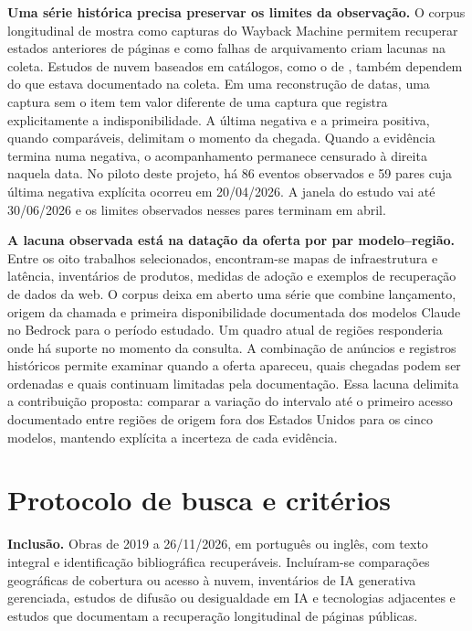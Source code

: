 \documentclass[12pt,a4paper]{article}
\begin{document}
\textbf{Uma série histórica precisa preservar os limites da observação.}
O corpus longitudinal de \citet[seções 4 e 5, tabela 1]{amos2021} mostra como capturas do Wayback Machine permitem recuperar estados anteriores de páginas e como falhas de arquivamento criam lacunas na coleta. Estudos de nuvem baseados em catálogos, como o de \citet[seções III e VI]{ekwe2024}, também dependem do que estava documentado na coleta. Em uma reconstrução de datas, uma captura sem o item tem valor diferente de uma captura que registra explicitamente a indisponibilidade. A última negativa e a primeira positiva, quando comparáveis, delimitam o momento da chegada. Quando a evidência termina numa negativa, o acompanhamento permanece censurado à direita naquela data. No piloto deste projeto, há 86 eventos observados e 59 pares cuja última negativa explícita ocorreu em 20/04/2026. A janela do estudo vai até 30/06/2026 e os limites observados nesses pares terminam em abril.

\textbf{A lacuna observada está na datação da oferta por par modelo--região.}
Entre os oito trabalhos selecionados, encontram-se mapas de infraestrutura e latência, inventários de produtos, medidas de adoção e exemplos de recuperação de dados da web. O corpus deixa em aberto uma série que combine lançamento, origem da chamada e primeira disponibilidade documentada dos modelos Claude no Bedrock para o período estudado. Um quadro atual de regiões responderia onde há suporte no momento da consulta. A combinação de anúncios e registros históricos permite examinar quando a oferta apareceu, quais chegadas podem ser ordenadas e quais continuam limitadas pela documentação. Essa lacuna delimita a contribuição proposta: comparar a variação do intervalo até o primeiro acesso documentado entre regiões de origem fora dos Estados Unidos para os cinco modelos, mantendo explícita a incerteza de cada evidência.

\clearpage



\clearpage
\appendix
\section{Protocolo de busca e critérios}
\begingroup
\small

\noindent\textbf{Inclusão.} Obras de 2019 a 26/11/2026, em português ou inglês, com texto integral e identificação bibliográfica recuperáveis. Incluíram-se comparações geográficas de cobertura ou acesso à nuvem, inventários de IA generativa gerenciada, estudos de difusão ou desigualdade em IA e tecnologias adjacentes e estudos que documentam a recuperação longitudinal de páginas públicas.
\end{document}
